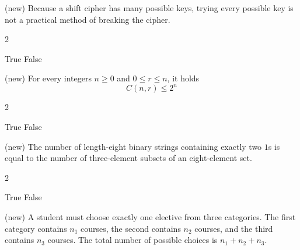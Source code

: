 \documentclass[11pt,addpoints]{exam}
\begin{document}
\begin{questions} %


\question[3] (new) Because a shift cipher has many possible keys, trying every possible key is not a practical method of breaking the cipher.

\begin{multicols}{2}
    \begin{choices}
        \choice True
        \choice False
    \end{choices}
\end{multicols}







\question[3] (new) For every integers $n\geq 0$ and $0\leq r\leq n$, it holds
\[
C(n,r)\leq 2^n
\]

\begin{multicols}{2}
    \begin{choices}
        \choice True
        \choice False
    \end{choices}
\end{multicols}



\question[3] (new) The number of length-eight binary strings containing exactly two $1$s is equal to the number of three-element subsets of an eight-element set.

\begin{multicols}{2}
    \begin{choices}
        \choice True
        \choice False
    \end{choices}
\end{multicols}




\question[3] (new) A student must choose exactly one elective from three categories. The first category contains $n_1$ courses, the second contains $n_2$ courses, and the third contains $n_3$ courses. The total number of possible choices is $n_1+n_2+n_3$.


\end{questions}
\end{document}
